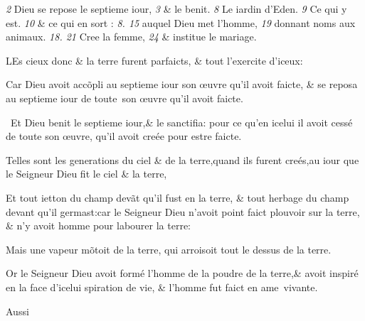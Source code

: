 \bchapter
{}
\pagestyle{scrplain}

\begin{chaptercomment}
 \emph{2} Dieu se repose le septieme iour,
 \emph{3} \& le benit.
 \emph{8} Le iardin d'Eden. \lb
 \emph{9} Ce qui y est.
 \emph{10} \& ce qui en sort :
 \emph{8. 15} auquel Dieu \lb
 met l'homme,
 \emph{19} donnant noms aux animaux.
 \emph{18. 21} Cree la \lb
 femme,
 \emph{24} \& institue le mariage.
\end{chaptercomment}

\vspace{\baselineskip}

\bversenonum \lettrine[lines=3,loversize=-0.2,lraise=0.2]{L}{}Es cieux donc \& la terre furent
parfaicts, \& tout l'exercite d'i\-ceux:

\bverse \footnotemarkmain{}Car Dieu avoit acc\~opli au septie\-me
iour son \oe{}uvre qu'il avoit faicte, \lb
\footnotemarkmain{}\& se reposa au septieme iour de tou\-te~son
\oe{}uvre qu'il avoit faicte.

\bverse Et Dieu \footnotemarkmain{}benit le septieme iour,\& le
sanctifia: pour ce qu'en icelui il avoit
cessé de toute son \oe{}uvre, qu'il avoit
creée pour estre faicte.

\bverse Telles sont les generations du ciel
\& de la terre,quand ils furent creés,au
iour que le Seigneur Dieu fit le ciel \&
la terre,

\bverse Et tout ietton du champ dev\~at qu'il
fust en la terre, \& tout herbage du
champ devant qu'il germast:car le Sei\-gneur
Dieu n'avoit point faict \footnotemarkmain{}plou\-voir
sur la terre, \& n'y avoit homme
pour labourer la terre:

\bverse Mais une vapeur m\~otoit de la terre,
qui arroisoit tout le dessus de la terre.

\bverse Or le Seigneur Dieu avoit formé
l'homme \footnotemarkmain{}de la poudre
de la terre,\footnotemarkmain{}\&
avoit inspiré en la face d'icelui spira\-tion
de vie, \& l'homme fut faict en
ame~vivante.

\begin{flushright}
Aussi
\end{flushright}


